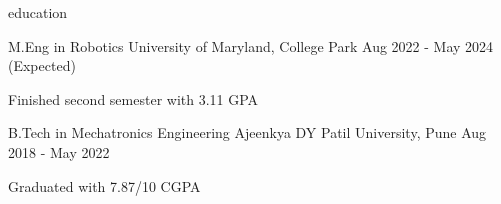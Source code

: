 \begin{section}{education}

  \begin{school}
    {M.Eng in Robotics}
    {University of Maryland, College Park}
    {Aug 2022 - May 2024 (Expected)}
    
    \item Finished second semester with 3.11 GPA

  \end{school}

  \begin{school}
    {B.Tech in Mechatronics Engineering}
    {Ajeenkya DY Patil University, Pune}
    {Aug 2018 - May 2022}

    \item Graduated with 7.87/10 CGPA

  \end{school}

\end{section}